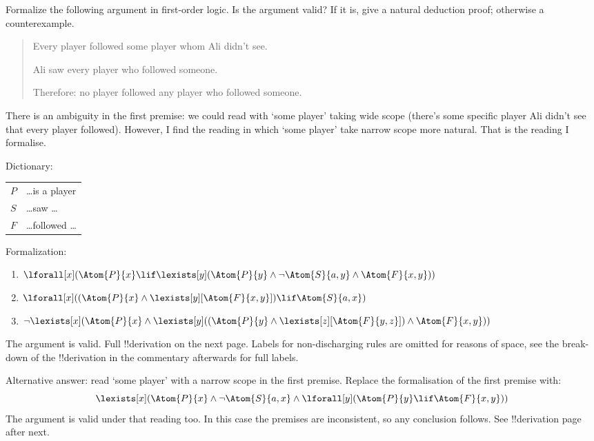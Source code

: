 \documentclass[../../../include/open-logic-section]{subfiles}
\begin{document}
\begin{prob}

    Formalize the following argument in first-order logic. Is the argument
    valid? If it is, give a natural deduction proof; otherwise a counterexample.
    \begin{quote}
    Every player followed some player whom Ali didn't see. 
    
    Ali saw every player who followed someone.
    
    Therefore: no player followed any player who followed someone.
    \end{quote}

    \begin{ans}
    There is an ambiguity in the first premise: we could read with 
    `some player' taking wide scope (there's some specific player Ali
    didn't see that every player followed). However, I find the 
    reading in which `some player' take narrow scope more natural.
    That is the reading I formalise. 
    
    Dictionary:

    \begin{tabular}{ll}
    $P$ & \dots is a player \\
    $S$ & \dots saw \dots \\
    $F$ & \dots followed \dots
    \end{tabular}
    
    Formalization:
    \begin{enumerate}
    \item $\lforall[x](\Atom{P}{x}\lif\lexists[y](\Atom{P}{y}\land\lnot\Atom{S}{a,y}\land\Atom{F}{x,y}))$
    \item $\lforall[x]((\Atom{P}{x}\land \lexists[y][\Atom{F}{x,y}])\lif\Atom{S}{a,x})$
    \item $\lnot\lexists[x](\Atom{P}{x}\land\lexists[y]((\Atom{P}{y}\land\lexists[z][\Atom{F}{y,z}])\land\Atom{F}{x,y}))$
    \end{enumerate}

    The argument is valid. Full !!{derivation} on the next page.
    Labels for non-discharging rules are omitted for reasons of space,
    see the break-down of the !!{derivation} in the commentary
    afterwards for full labels.

    Alternative answer: read `some player' with a narrow scope in 
    the first premise. Replace the formalisation of the first 
    premise with:
    $$
    \lexists[x](\Atom{P}{x}\land\lnot\Atom{S}{a,x}\land\lforall[y](\Atom{P}{y}\lif\Atom{F}{x,y}))
    $$
    The argument is valid under that reading too. In this case the 
    premises are inconsistent, so any conclusion follows. See
    !!{derivation} page after next.
    

\end{ans}
\end{prob}
\end{document}
